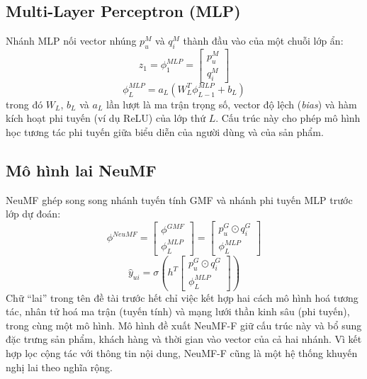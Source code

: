 \subsection{Multi-Layer Perceptron (MLP)}
\label{subsec:mlp}

Nhánh MLP nối vector nhúng $p_u^M$ và $q_i^M$ thành đầu vào của một chuỗi lớp ẩn:
\begin{equation*}
    z_1 = \phi_1^{MLP} = \begin{bmatrix} p_u^M \\ q_i^M \end{bmatrix}
\end{equation*}
\begin{equation*}
    \phi_L^{MLP} = a_L \left( W_L^T \phi_{L-1}^{MLP} + b_L \right)
\end{equation*}
trong đó $W_L$, $b_L$ và $a_L$ lần lượt là ma trận trọng số, vector độ lệch (\textit{bias}) và hàm kích hoạt phi tuyến (ví dụ ReLU) của lớp thứ $L$. Cấu trúc này cho phép mô hình học tương tác phi tuyến giữa biểu diễn của người dùng và của sản phẩm.

\subsection{Mô hình lai NeuMF}
\label{subsec:neumf_arch}

NeuMF ghép song song nhánh tuyến tính GMF và nhánh phi tuyến MLP trước lớp dự đoán:
\begin{equation*}
    \phi^{NeuMF} = \begin{bmatrix} \phi^{GMF} \\ \phi_L^{MLP} \end{bmatrix} = \begin{bmatrix} p_u^G \odot q_i^G \\ \phi_L^{MLP} \end{bmatrix}
\end{equation*}
\begin{equation*}
    \hat{y}_{ui} = \sigma \left( h^T \begin{bmatrix} p_u^G \odot q_i^G \\ \phi_L^{MLP} \end{bmatrix} \right)
\end{equation*}
Chữ ``lai'' trong tên đề tài trước hết chỉ việc kết hợp hai cách mô hình hoá tương tác, nhân tử hoá ma trận (tuyến tính) và mạng lưới thần kinh sâu (phi tuyến), trong cùng một mô hình. Mô hình đề xuất NeuMF-F giữ cấu trúc này và bổ sung đặc trưng sản phẩm, khách hàng và thời gian vào vector của cả hai nhánh. Vì kết hợp lọc cộng tác với thông tin nội dung, NeuMF-F cũng là một hệ thống khuyến nghị lai theo nghĩa rộng.

